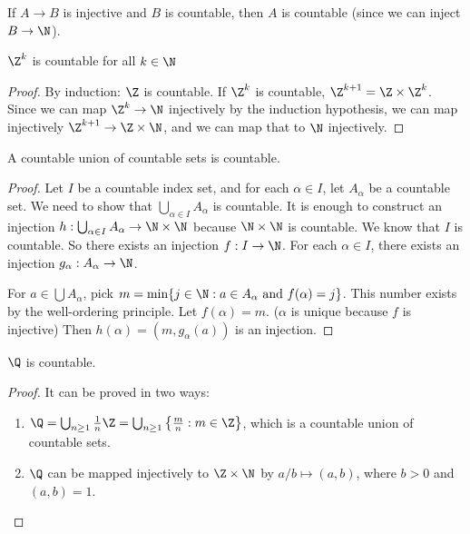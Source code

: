 \documentclass[a4paper]{article}
\begin{document}
\begin{prop}
  If $A\to B$ is injective and $B$ is countable, then $A$ is countable (since we can inject $B \to \N$).
\end{prop}

\begin{prop}
  $\Z^k$ is countable for all $k\in \N$
\end{prop}

\begin{proof}
  By induction: $\Z$ is countable. If $\Z^k$ is countable, $\Z^{k + 1} = \Z\times \Z^k$. Since we can map $\Z^k \to \N$ injectively by the induction hypothesis, we can map injectively $\Z^{k + 1}\to \Z\times \N$, and we can map that to $\N$ injectively.
\end{proof}

\begin{thm}
  A countable union of countable sets is countable.
\end{thm}

\begin{proof}
  Let $I$ be a countable index set, and for each $\alpha \in I$, let $A_\alpha$ be a countable set. We need to show that $\bigcup_{\alpha\in I} A_\alpha$ is countable. It is enough to construct an injection $h: \bigcup_{\alpha\in I} A_\alpha \to \N\times \N$ because $\N\times\N$ is countable. We know that $I$ is countable. So there exists an injection $f: I\to \N$. For each $\alpha\in I$, there exists an injection $g_\alpha: A_\alpha \to\N$.

  For $a\in \bigcup A_\alpha$, pick $m = \min\{j\in \N: a\in A_{\alpha}\text{ and }f(\alpha) = j\}$. This number exists by the well-ordering principle. Let $f(\alpha) = m$. ($\alpha$ is unique because $f$ is injective) Then $h(\alpha) = (m,g_\alpha(a))$ is an injection.
\end{proof}

\begin{prop}
  $\Q$ is countable.
\end{prop}
\begin{proof}
  It can be proved in two ways:
  \begin{enumerate}
    \item $\Q = \bigcup_{n\geq 1} \frac{1}{n}\Z = \bigcup_{n\geq 1} \left\{\frac{m}{n}: m\in \Z\right\}$, which is a countable union of countable sets.
    \item $\Q$ can be mapped injectively to $\Z\times \N$ by $a/b\mapsto (a, b)$, where $b > 0$ and $(a, b) = 1$.
  \end{enumerate}
\end{proof}
\end{document}
